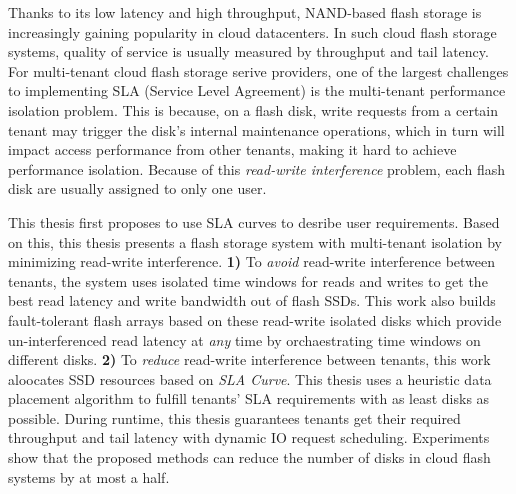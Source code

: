 \begin{abstract*}
  Thanks to its low latency and high throughput, NAND-based flash storage is increasingly gaining popularity in cloud datacenters.
  In such cloud flash storage systems, quality of service is usually measured by throughput and tail latency.
  For multi-tenant cloud flash storage serive providers, one of the largest challenges to implementing SLA (Service Level Agreement)
  is the multi-tenant performance isolation problem.
  This is because, on a flash disk, write requests from a certain tenant may trigger the disk's internal maintenance operations,
  which in turn will impact access performance from other tenants, making it hard to achieve performance isolation.
  Because of this \textit{read-write interference} problem, each flash disk are usually assigned to only one user.

  This thesis first proposes to use SLA curves to desribe user requirements.
  Based on this, this thesis presents a flash storage system with multi-tenant isolation by minimizing read-write interference.
  \textbf{1)} To \textit{avoid} read-write interference between tenants, the system uses isolated time windows for reads and writes to
  get the best read latency and write bandwidth out of flash SSDs.
  This work also builds fault-tolerant flash arrays based on these read-write isolated disks which provide
  un-interferenced read latency at \textit{any} time by orchaestrating time windows on different disks.
  \textbf{2)} To \textit{reduce} read-write interference between tenants, this work aloocates SSD resources based on \textit{SLA Curve}.
  This thesis uses a heuristic data placement algorithm to fulfill tenants' SLA requirements with as least disks as possible.
  During runtime, this thesis guarantees tenants get their required throughput and tail latency with dynamic IO request scheduling.
  Experiments show that the proposed methods can reduce the number of disks in cloud flash systems by at most a half.
\end{abstract*}
